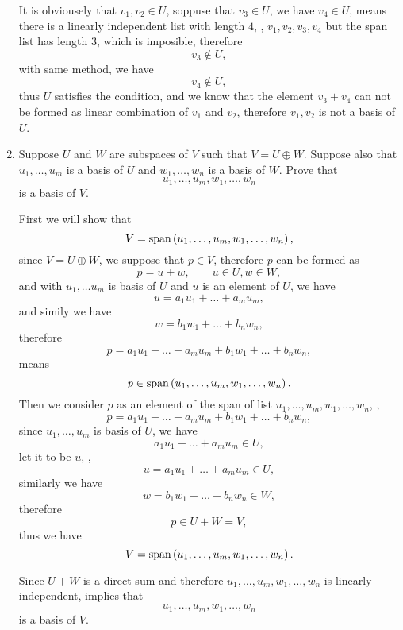 \begin{enumerate}
\begin{solution}
            It is obviousely that $v_1,v_2 \in U$, soppuse that $v_3 \in U$, we have $v_4 \in U$, means there is a linearly independent list with length $4$, 
            \ie, $v_1, v_2, v_3, v_4$ but the span list has length $3$, which is imposible, therefore 
            \[ v_3 \notin U,\]
            with same method, we have 
            \[ v_4 \notin U,\]
            thus $U$ satisfies the condition, and we know that the element $v_3 + v_4$ can not be formed as linear combination of $v_1$ and $v_2$, therefore 
            $v_1, v_2$ is not a basis of $U$.
        \end{solution}
    \item Suppose $U$ and $W$ are subspaces of $V$ such that $V = U \oplus W$. Suppose also that $u_1, \ldots, u_m$ is a basis of $U$ 
        and $w_1, \ldots, w_n$ is a basis of $W$. Prove that 
        \[ u_1, \ldots,u_m, w_1, \ldots, w_n\]
        is a basis of $V$.
        \begin{solution}
            First we will show that 
            \[ V = \text{span}\left(u_1, \ldots, u_m, w_1, \ldots, w_n\right),\]
            since $V = U \oplus W$, we suppose that $p \in V$, therefore $p$ can be formed as 
            \[ p = u + w, \qquad u \in U, w \in W,\]
            and with $u_1, \ldots u_m$ is basis of $U$ and $u$ is an element of $U$, we have 
            \[ u = a_1 u_1 + \dots + a_mu_m,\]
            and simily we have 
            \[ w = b_1w_1 + \dots + b_nw_n,\]
            therefore 
            \[ p = a_1u_1 + \dots + a_mu_m + b_1w_1 + \dots + b_nw_n,\]
            means 
            \[ p \in \text{span}\left(u_1, \ldots, u_m, w_1, \ldots, w_n\right).\]
            Then we consider $p$ as an element of the span of list $u_1, \ldots, u_m, w_1, \ldots, w_n$, \ie, 
            \[ p = a_1u_1 + \dots + a_mu_m + b_1w_1 + \dots + b_nw_n ,\]
            since $u_1, \ldots, u_m$ is basis of $U$, we have 
            \[ a_1u_1 + \dots + a_mu_m \in U, \]
            let it to be $u$, \ie, 
            \[ u = a_1u_1 + \dots + a_mu_m \in U,\]
            similarly we have 
            \[ w = b_1w_1 + \dots + b_nw_n \in W,\]
            therefore 
            \[ p \in U + W = V,\]
            thus we have 
            \[ V = \text{span}\left(u_1, \ldots, u_m, w_1, \ldots, w_n\right).\]

            Since $U+W$ is a direct sum and therefore $u_1, \ldots, u_m, w_1, \ldots, w_n$ is linearly independent, implies that 
            \[ u_1, \ldots, u_m, w_1, \ldots, w_n\]
            is a basis of $V$.
        \end{solution}
\end{enumerate}

